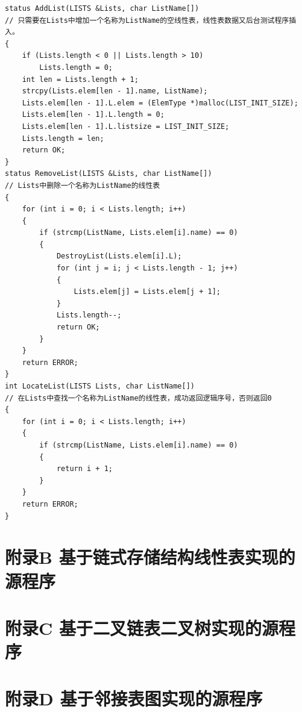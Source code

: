 \documentclass[supercite]{Experimental_Report}
\theoremstyle{definition}
\begin{document}
\begin{lstlisting}
status AddList(LISTS &Lists, char ListName[])
// 只需要在Lists中增加一个名称为ListName的空线性表，线性表数据又后台测试程序插入。
{
	if (Lists.length < 0 || Lists.length > 10)
		Lists.length = 0;
	int len = Lists.length + 1;
	strcpy(Lists.elem[len - 1].name, ListName);
	Lists.elem[len - 1].L.elem = (ElemType *)malloc(LIST_INIT_SIZE);
	Lists.elem[len - 1].L.length = 0;
	Lists.elem[len - 1].L.listsize = LIST_INIT_SIZE;
	Lists.length = len;
	return OK;
}
status RemoveList(LISTS &Lists, char ListName[])
// Lists中删除一个名称为ListName的线性表
{
	for (int i = 0; i < Lists.length; i++)
	{
		if (strcmp(ListName, Lists.elem[i].name) == 0)
		{
			DestroyList(Lists.elem[i].L);
			for (int j = i; j < Lists.length - 1; j++)
			{
				Lists.elem[j] = Lists.elem[j + 1];
			}
			Lists.length--;
			return OK;
		}
	}
	return ERROR;
}
int LocateList(LISTS Lists, char ListName[])
// 在Lists中查找一个名称为ListName的线性表，成功返回逻辑序号，否则返回0
{
	for (int i = 0; i < Lists.length; i++)
	{
		if (strcmp(ListName, Lists.elem[i].name) == 0)
		{
			return i + 1;
		}
	}
	return ERROR;
}
\end{lstlisting}
\newpage
\section{附录B 基于链式存储结构线性表实现的源程序}
\newpage
\section{附录C 基于二叉链表二叉树实现的源程序}
\newpage
\section{附录D 基于邻接表图实现的源程序}
\end{document}

